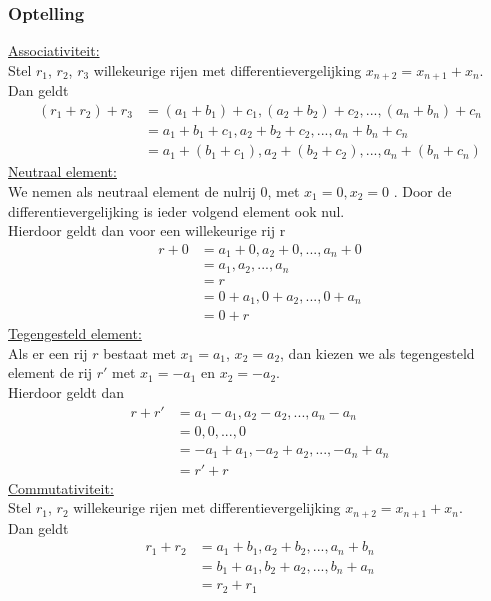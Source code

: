 \documentclass[lineaire_algebra_oplossingen.tex]{subfiles}
\begin{document}
\subsubsection*{Optelling}
\underline{Associativiteit:}\\
Stel $r_1$, $r_2$, $r_3$ willekeurige rijen met differentievergelijking $x_{n + 2} = x_{n + 1} + x_n$.\\
Dan geldt
\begin{align*}
    (r_1 + r_2) + r_3 &= (a_1 + b_1) + c_1 , (a_2 + b_2) + c_2 , ... , (a_n + b_n)+ c_n\\
    &= a_1 + b_1 + c_1, a_2 + b_2 + c_2, ... , a_n + b_n + c_n\\
    &= a_1 + (b_1 + c_1), a_2 + (b_2 + c_2), ..., a_n + (b_n + c_n)
\end{align*}
\underline{Neutraal element:}\\
We nemen als neutraal element de nulrij 0, met $x_1 = 0, x_2 = 0$ . 
Door de differentievergelijking is ieder volgend element ook nul.\\
Hierdoor geldt dan voor een willekeurige rij r
\begin{align*}
  r + 0 &= a_1 + 0, a_2 + 0, ..., a_n + 0\\
  &= a_1, a_2, ..., a_n\\
  &= r\\
  &= 0 + a_1, 0 + a_2, ..., 0 + a_n\\
  &= 0 + r
\end{align*}
\underline{Tegengesteld element:}\\
Als er een rij $r$ bestaat met $x_1 = a_1$, $x_2 = a_2$, dan kiezen we als tegengesteld element de rij $r'$ met $x_1 = -a_1$ en $x_2 = -a_2$.\\
Hierdoor geldt dan
\begin{align*}
    r + r' &= a_1 - a_1, a_2 - a_2, ...,a_n - a_n\\
    &= 0, 0, ..., 0\\
    &= -a_1 + a_1, -a_2 + a_2, ..., -a_n + a_n\\
    &= r' + r
\end{align*}
\underline{Commutativiteit:}\\
Stel $r_1$, $r_2$ willekeurige rijen met differentievergelijking $x_{n + 2} = x_{n + 1} + x_n$.\\
Dan geldt
\begin{align*}
    r_1 + r_2 &= a_1 + b_1, a_2 + b_2, ..., a_n + b_n\\
    &= b_1 + a_1, b_2 + a_2, ..., b_n + a_n\\
    &= r_2 + r_1
\end{align*}
\end{document}
